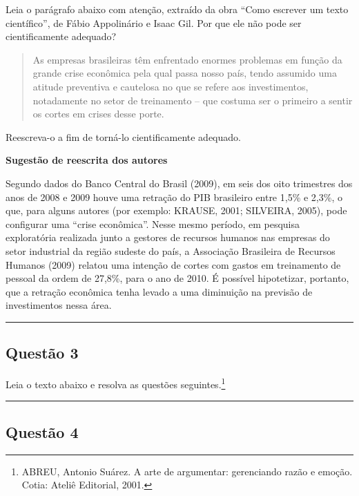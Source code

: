 \documentclass[
]{book}
\begin{document}
Leia o parágrafo abaixo com atenção, extraído da obra ``Como escrever um texto científico'', de Fábio Appolinário e Isaac Gil. Por que ele não pode ser cientificamente adequado?

\begin{quote}
As empresas brasileiras têm enfrentado enormes problemas em função da grande crise econômica pela qual passa nosso país, tendo assumido uma atitude preventiva e cautelosa no que se refere aos investimentos, notadamente no setor de treinamento -- que costuma ser o primeiro a sentir os cortes em crises desse porte.
\end{quote}

Reescreva-o a fim de torná-lo cientificamente adequado.

\textbf{Sugestão de reescrita dos autores}

Segundo dados do Banco Central do Brasil (2009), em seis dos oito trimestres dos anos de 2008 e 2009 houve uma retração do PIB brasileiro entre 1,5\% e 2,3\%, o que, para alguns autores (por exemplo: KRAUSE, 2001; SILVEIRA, 2005), pode configurar uma ``crise econômica''. Nesse mesmo período, em pesquisa exploratória realizada junto a gestores de recursos humanos nas empresas do setor industrial da região sudeste do país, a Associação Brasileira de Recursos Humanos (2009) relatou uma intenção de cortes com gastos em treinamento de pessoal da ordem de 27,8\%, para o ano de 2010. É possível hipotetizar, portanto, que a retração econômica tenha levado a uma diminuição na previsão de investimentos nessa área.

\begin{center}\rule{0.5\linewidth}{0.5pt}\end{center}

\subsection{Questão 3}\label{questuxe3o-3-1}

Leia o texto abaixo e resolva as questões seguintes.\footnote{ABREU, Antonio Suárez. A arte de argumentar: gerenciando razão e emoção. Cotia: Ateliê Editorial,
  2001.}

\begin{center}\rule{0.5\linewidth}{0.5pt}\end{center}

\subsection{Questão 4}\label{questuxe3o-4-1}
\end{document}
